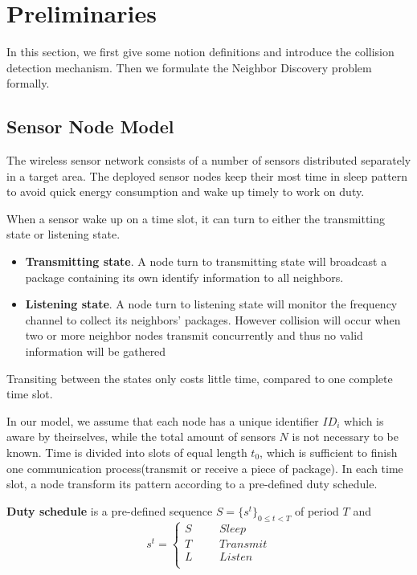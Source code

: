 \section{Preliminaries}
\label{sectionmodel}

In this section, we first give some notion definitions and introduce the collision detection mechanism. 
Then we formulate the Neighbor Discovery problem formally.  


\subsection{Sensor Node Model}

The wireless sensor network consists of a number of sensors distributed separately in a target area.
The deployed sensor nodes keep their most time in sleep pattern to avoid quick energy consumption 
and wake up timely to work on duty.

When a sensor wake up on a time slot, it can turn to either the transmitting state or listening state. 
\begin{itemize}
\item \textbf{Transmitting state}. A node turn to transmitting state will broadcast a package containing its own identify 
information to all neighbors.
\item  \textbf{Listening state}. A node turn to listening state will monitor the frequency channel to collect its neighbors' packages.
However collision will occur when two or more neighbor nodes transmit concurrently and thus no valid information will be gathered
\end{itemize}
Transiting between the states only costs little time, compared to one complete time slot.

In our model, we assume that each node has a unique identifier $ID_i$ which is aware by theirselves, while the total amount of sensors $N$  is not necessary to be known. Time is divided into slots of equal length $t_0$, 
which is sufficient to finish  one communication process(transmit or receive a piece of package). In each time slot, a node transform its pattern according to a pre-defined duty schedule.


\begin{definition}
\textbf{Duty schedule} is a pre-defined sequence $S=\{s^t\}_{0\leq t<T}$ of period $T$ and
$$ s^t=\left\{
\begin{aligned}
S  & & & {Sleep}\\
T  & & & {Transmit}\\
L  & & & {Listen}\\
\end{aligned}
\right.
$$
\end{definition}

